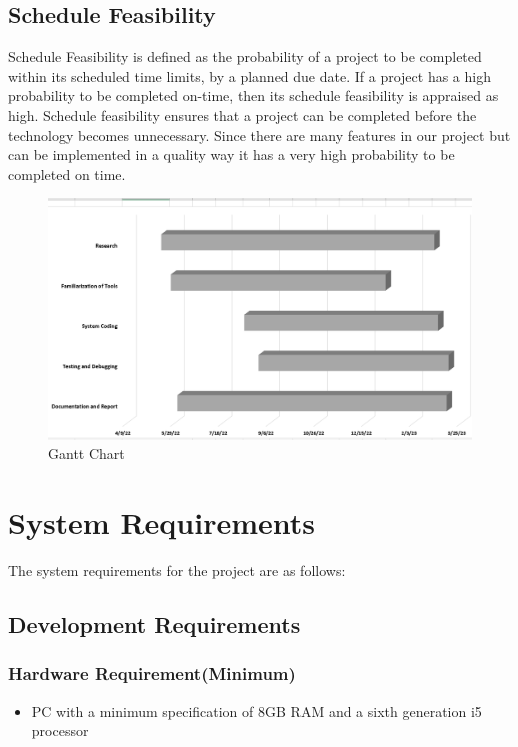 \subsection{Schedule Feasibility}
Schedule Feasibility is defined as the probability of a project to be completed within its 
scheduled time limits, by a planned due date. If a project has a high probability to be 
completed on-time, then its schedule feasibility is appraised as high. Schedule 
feasibility ensures that a project can be completed before the technology becomes 
unnecessary. Since there are many features in our project but can be implemented in a 
quality way it has a very high probability to be completed on time.
\begin{figure}[h!]
    \includegraphics[scale=0.35]{images/Gantchart.png}
    \caption{Gantt Chart}
    \label{fig:my_label}
\end{figure}
\section{System Requirements}
The system requirements for the project are as follows:

\subsection{Development Requirements}
\subsubsection{Hardware Requirement(Minimum)}
\begin{itemize}
    \item  PC with a minimum specification of 8GB RAM and a sixth generation i5 
processor
\end{itemize}

